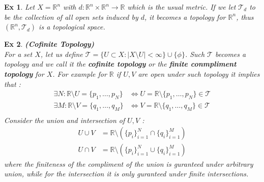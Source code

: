 \documentclass[paper=a4, fontsize=11pt]{scrartcl}
\newcommand{\T}{\mathcal{T}}
\newtheorem{example}{Ex}
\begin{document}
\vspace{0.15in}

\begin{example}
Let $X=\mathbb{R}^n$ with $d : \mathbb{R}^n \times \mathbb{R}^n \to \mathbb{R}$ which is the usual metric. If we let $\T_d$ to be the collection of all open sets induced by $d$, it becomes a topology for $\mathbb{R}^n$, thus $(\mathbb{R}^n,\T_d)$ is a topological space.
\end{example}

\vspace{0.15in}

\begin{example}\textbf{(Cofinite Topology)} \\[0.1in]
	For a set $X$, let us define $\T = \{ U \subset X : |X\setminus U| < \infty \} \cup \{ \phi \}$. Such $\T$ becomes a topology and we call it the \textbf{cofinite topology} or the \textbf{finite conmpliment topology} for $X$. For example for $\mathbb{R}$ if $U,V$ are open under such topology it implies that :
	\begin{equation}\nonumber
	\begin{split}
		\exists N : \mathbb{R} \setminus U = \{ p_1, \dots, p_N \} &\iff U = \mathbb{R} \setminus \{ p_1, \dots, p_N \} \in \T \\
		\exists M : \mathbb{R} \setminus V = \{ q_1 , \dots , q_M \} &\iff V=\mathbb{R} \setminus \{ q_1 , \dots , q_M \} \in \T\\
	\end{split}
	\end{equation}
	Consider the union and intersection of $U,V$ : 
	\begin{equation}\nonumber
	\begin{split}
		U \cup V &= \mathbb{R} \setminus \left( \{p_i\}_{i=1}^N \cap \{q_i\}_{i=1}^M \right) \\
		U \cap V &= \mathbb{R} \setminus \left( \{p_i\}_{i=1}^N \cup \{q_i\}_{i=1}^M \right)
	\end{split}
	\end{equation}
	where the finiteness of the compliment of the union is guranteed under arbitrary union, while for the intersection it is only guranteed under finite intersections.
\end{example}

\vspace{0.15in}
\end{document}
